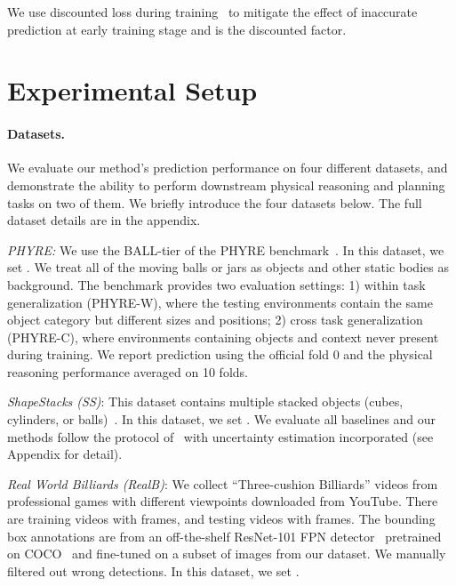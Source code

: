 \documentclass{article} \usepackage{iclr2021_conference,times}
\begin{document}
\vspace{-0.4em}

We use discounted loss during training~\citep{watters2017visual} to mitigate the effect of inaccurate prediction at early training stage and  is the discounted factor.

\vspace{-0.6em}
\section{Experimental Setup}
\vspace{-0.6em}

\paragraph{Datasets.}
We evaluate our method's prediction performance on four different datasets, and demonstrate the ability to perform downstream physical reasoning and planning tasks on two of them. We briefly introduce the four datasets below. The full dataset details are in the appendix.

\textit{PHYRE:} We use the BALL-tier of the PHYRE benchmark~\citep{bakhtin2019phyre}. In this dataset, we set . We treat all of the moving balls or jars as objects and other static bodies as background. The benchmark provides two evaluation settings: 1) within task generalization (PHYRE-W), where the testing environments contain the same object category but different sizes and positions; 2) cross task generalization (PHYRE-C), where environments containing objects and context never present during training. We report prediction using the official fold 0 and the physical reasoning performance averaged on 10 folds.

\textit{ShapeStacks (SS)}: This dataset contains multiple stacked objects (cubes, cylinders, or balls)~\citep{ye2019cvp}. In this dataset, we set . We evaluate all baselines and our methods follow the protocol of~\citep{ye2019cvp} with uncertainty estimation incorporated (see Appendix for detail).

\textit{Real World Billiards (RealB)}: We collect ``Three-cushion Billiards'' videos from professional games with different viewpoints downloaded from YouTube. There are  training videos with  frames, and  testing videos with  frames. The bounding box annotations are from an off-the-shelf ResNet-101 FPN detector~\citep{lin2017feature} pretrained on COCO~\citep{lin2014microsoft} and fine-tuned on a subset of  images from our dataset. We manually filtered out wrong detections. In this dataset, we set .
\end{document}
